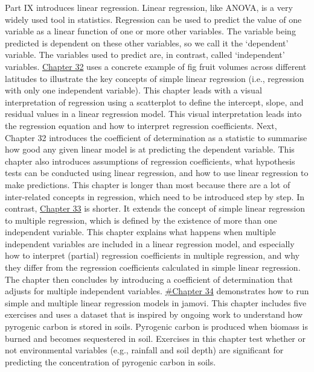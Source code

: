 \documentclass[
]{scrbook}
\begin{document}
Part IX introduces linear regression.
Linear regression, like ANOVA, is a very widely used tool in statistics.
Regression can be used to predict the value of one variable as a linear function of one or more other variables.
The variable being predicted is dependent on these other variables, so we call it the `dependent' variable.
The variables used to predict are, in contrast, called `independent' variables.
\protect\hyperlink{Chapter_32}{Chapter 32} uses a concrete example of fig fruit volumes across different latitudes to illustrate the key concepts of simple linear regression (i.e., regression with only one independent variable).
This chapter leads with a visual interpretation of regression using a scatterplot to define the intercept, slope, and residual values in a linear regression model.
This visual interpretation leads into the regression equation and how to interpret regression coefficients.
Next, Chapter 32 introduces the coefficient of determination as a statistic to summarise how good any given linear model is at predicting the dependent variable.
This chapter also introduces assumptions of regression coefficients, what hypothesis tests can be conducted using linear regression, and how to use linear regression to make predictions.
This chapter is longer than most because there are a lot of inter-related concepts in regression, which need to be introduced step by step.
In contrast, \protect\hyperlink{Chapter_33}{Chapter 33} is shorter.
It extends the concept of simple linear regression to multiple regression, which is defined by the existence of more than one independent variable.
This chapter explains what happens when multiple independent variables are included in a linear regression model, and especially how to interpret (partial) regression coefficients in multiple regression, and why they differ from the regression coefficients calculated in simple linear regression.
The chapter then concludes by introducing a coefficient of determination that adjusts for multiple independent variables.
\protect\hyperlink{Chapter_34}{\#Chapter 34} demonstrates how to run simple and multiple linear regression models in jamovi.
This chapter includes five exercises and uses a dataset that is inspired by ongoing work to understand how pyrogenic carbon is stored in soils.
Pyrogenic carbon is produced when biomass is burned and becomes sequestered in soil.
Exercises in this chapter test whether or not environmental variables (e.g., rainfall and soil depth) are significant for predicting the concentration of pyrogenic carbon in soils.
\end{document}
